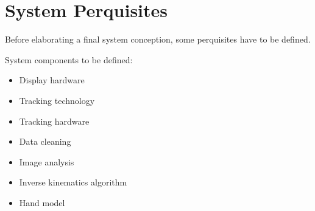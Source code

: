 \chapter{System Perquisites}

Before elaborating a final system conception, some perquisites have to be defined.

System components to be defined:
\begin{itemize}
 \item Display hardware
 \item Tracking technology
 \item Tracking hardware
 \item Data cleaning
 \item Image analysis
 \item Inverse kinematics algorithm
 \item Hand model
 \end{itemize} 

